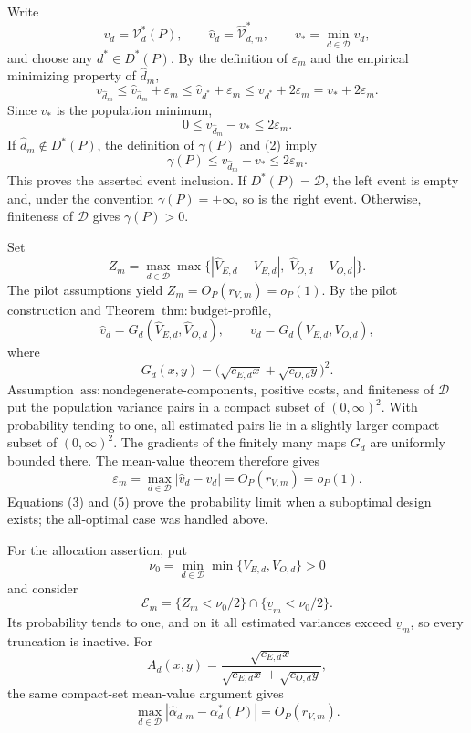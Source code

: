 Write
\[
 v_d=\mathcal V_d^*(P),\qquad
 \widehat v_d=\widehat{\mathcal V}_{d,m}^*,
 \qquad v_*=\min_{d\in\mathcal D}v_d,
\]
and choose any \(d^*\in D^*(P)\).  By the definition of \(\varepsilon_m\) and the empirical minimizing property of \(\widehat d_m\),
\[
 v_{\widehat d_m}
 \le \widehat v_{\widehat d_m}+\varepsilon_m
 \le \widehat v_{d^*}+\varepsilon_m
 \le v_{d^*}+2\varepsilon_m
 =v_*+2\varepsilon_m.                                             \tag{1}
\]
Since \(v_*\) is the population minimum,
\[
 0\le v_{\widehat d_m}-v_*\le2\varepsilon_m.                     \tag{2}
\]
If \(\widehat d_m\notin D^*(P)\), the definition of \(\gamma(P)\) and (2) imply
\[
 \gamma(P)\le v_{\widehat d_m}-v_*\le2\varepsilon_m.             \tag{3}
\]
This proves the asserted event inclusion.  If \(D^*(P)=\mathcal D\), the left event is empty and, under the convention \(\gamma(P)=+\infty\), so is the right event.  Otherwise, finiteness of \(\mathcal D\) gives \(\gamma(P)>0\).

Set
\[
 Z_m=\max_{d\in\mathcal D}\max\bigl\{
 |\widehat V_{E,d}-V_{E,d}|,
 |\widehat V_{O,d}-V_{O,d}|\bigr\}.
\]
The pilot assumptions yield \(Z_m=O_P(r_{V,m})=o_P(1)\).  By the pilot construction and Theorem~\(\mathrm{thm{:}budget\text{-}profile}\),
\[
 \widehat v_d=G_d(\widehat V_{E,d},\widehat V_{O,d}),
 \qquad
 v_d=G_d(V_{E,d},V_{O,d}),                                        \tag{4}
\]
where
\[
 G_d(x,y)=\bigl(\sqrt{c_{E,d}x}+\sqrt{c_{O,d}y}\bigr)^2.
\]
Assumption~\(\mathrm{ass{:}nondegenerate\text{-}components}\), positive costs, and finiteness of \(\mathcal D\) put the population variance pairs in a compact subset of \((0,\infty)^2\).  With probability tending to one, all estimated pairs lie in a slightly larger compact subset of \((0,\infty)^2\).  The gradients of the finitely many maps \(G_d\) are uniformly bounded there.  The mean-value theorem therefore gives
\[
 \varepsilon_m
 =\max_{d\in\mathcal D}|\widehat v_d-v_d|
 =O_P(r_{V,m})=o_P(1).                                             \tag{5}
\]
Equations (3) and (5) prove the probability limit when a suboptimal design exists; the all-optimal case was handled above.

For the allocation assertion, put
\[
 \nu_0=\min_{d\in\mathcal D}\min\{V_{E,d},V_{O,d}\}>0
\]
and consider
\[
 \mathcal E_m
 =\{Z_m<\nu_0/2\}\cap\{\underline v_m<\nu_0/2\}.             \tag{6}
\]
Its probability tends to one, and on it all estimated variances exceed \(\underline v_m\), so every truncation is inactive.  For
\[
 A_d(x,y)=
 \frac{\sqrt{c_{E,d}x}}
 {\sqrt{c_{E,d}x}+\sqrt{c_{O,d}y}},
\]
the same compact-set mean-value argument gives
\[
 \max_{d\in\mathcal D}
 |\widehat\alpha_{d,m}-\alpha_d^*(P)|=O_P(r_{V,m}).                \tag{7}
\]

